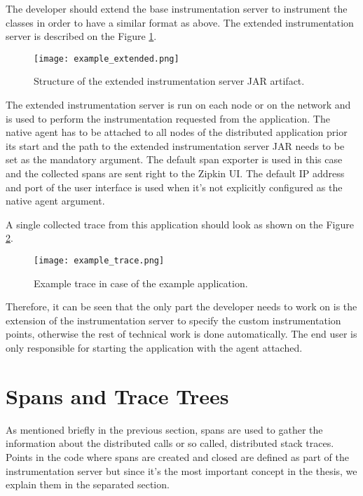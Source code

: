 The developer should extend the base instrumentation server to instrument the classes in order to have a similar format as above. The extended instrumentation server is described on the Figure \ref{fig:example_extended}.

	\begin{figure}
		\centering
		\texttt{[image: example\_extended.png]}
		\caption{Structure of the extended instrumentation server JAR artifact.}
		\label{fig:example_extended}
	\end{figure}

The extended instrumentation server is run on each node or on the network and is used to perform the instrumentation requested from the application. The native agent has to be attached to all nodes of the distributed application prior its start and the path to the extended instrumentation server JAR needs to be set as the mandatory argument. The default span exporter is used in this case and the collected spans are sent right to the Zipkin UI. The default IP address and port of the user interface is used when it's not explicitly configured as the native agent argument.

A single collected trace from this application should look as shown on the Figure \ref{fig:example_trace}.

	\begin{figure}
		\centering
		\texttt{[image: example\_trace.png]}
		\caption{Example trace in case of the example application.}
		\label{fig:example_trace}
	\end{figure}

Therefore, it can be seen that the only part the developer needs to work on is the extension of the instrumentation server to specify the custom instrumentation points, otherwise the rest of technical work is done automatically. The end user is only responsible for starting the application with the agent attached.

\section{Spans and Trace Trees}
\label{subsec:spans}
As mentioned briefly in the previous section, spans are used to gather the information about the distributed calls or so called, distributed stack traces. Points in the code where spans are created and closed are defined as part of the instrumentation server but since it's the most important concept in the thesis, we explain them in the separated section. 

